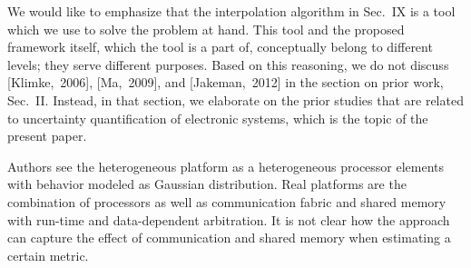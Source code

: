 \begin{authors}
We would like to emphasize that the interpolation algorithm in Sec.~IX is a tool
which we use to solve the problem at hand. This tool and the proposed framework
itself, which the tool is a part of, conceptually belong to different levels;
they serve different purposes. Based on this reasoning, we do not discuss
[Klimke,~2006], [Ma,~2009], and [Jakeman,~2012] in the section on prior work,
Sec.~II. Instead, in that section, we elaborate on the prior studies that are
related to uncertainty quantification of electronic systems, which is the topic
of the present paper.

\begin{actions}

\end{actions}
\end{authors}

\begin{reviewer}
Authors see the heterogeneous platform as a heterogeneous processor elements
with behavior modeled as Gaussian distribution. Real platforms are the
combination of processors as well as communication fabric and shared memory with
run-time and data-dependent arbitration. It is not clear how the approach can
capture the effect of communication and shared memory when estimating a certain
metric.
\end{reviewer}

